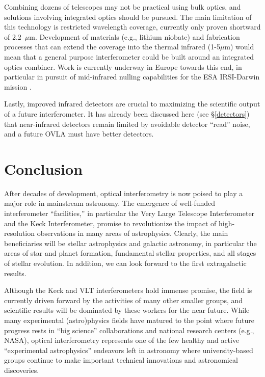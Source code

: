 \documentclass[12pt]{article}
\begin{document}
Combining dozens of telescopes may not be practical using bulk optics,
and solutions involving integrated optics should be pursued. The main
limitation of this technology is restricted wavelength coverage,
currently only proven shortward of 2.2~$\mu$m.  Development of
materials (e.g., lithium niobate) and fabrication processes that can
extend the coverage into the thermal infrared (1-5$\mu$m) would mean
that a general purpose interferometer could be built around an
integrated optics combiner.  Work is currently underway in Europe
towards this end, in particular in pursuit of mid-infrared nulling
capabilities for the ESA IRSI-Darwin mission \citep{haguenauer2002}.

Lastly, improved infrared detectors are crucial to maximizing the
scientific output of a future interferometer. It has already been
discussed here (see \S\ref{detectors}) that near-infrared detectors
remain limited by avoidable detector ``read'' noise, and 
a future OVLA must have better detectors.  


\section{Conclusion}
After decades of development, optical interferometry is now poised to
play a major role in mainstream astronomy. The emergence of
well-funded interferometer ``facilities,'' in particular the Very
Large Telescope Interferometer and the Keck Interferometer, promise to
revolutionize the impact of high-resolution observations in many areas
of astrophysics.  Clearly, the main beneficiaries will be 
stellar astrophysics and galactic astronomy, in particular the areas
of star and planet formation, fundamental stellar properties, and all
stages of stellar evolution.  In addition, we can look forward to the first
extragalactic results.

Although the Keck and VLT interferometers hold immense promise, the
field is currently driven forward by the activities of many other
smaller groups, and scientific results will be dominated by these
workers for the near future.  While many experimental (astro)physics
fields have matured to the point where future progress rests in ``big
science'' collaborations and national research centers (e.g., NASA),
optical interferometry represents one of the few healthy and active
``experimental astrophysics'' endeavors left in astronomy where
university-based groups continue to make important technical
innovations and astronomical discoveries.
\end{document}
